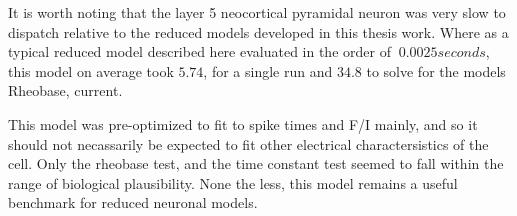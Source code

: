     
It is worth noting that the layer 5 neocortical pyramidal neuron was very slow to dispatch relative to the reduced models developed in this thesis work. Where as a typical reduced model described here evaluated in the order of $~0.0025 seconds$, this model on average took $5.74$, for a single run and $34.8$ to solve for the models Rheobase, current.


This model was pre-optimized to fit to spike times and F/I mainly, and so it should not necassarily be expected to fit other electrical charactersistics of the cell. Only the rheobase test, and the time constant test seemed to fall within the range of biological plausibility.
None the less, this model remains a useful benchmark for reduced neuronal models.